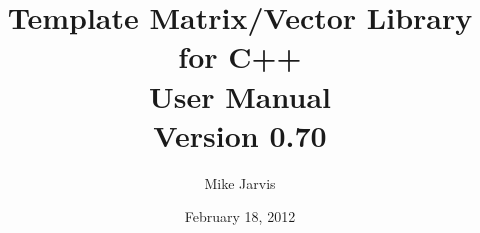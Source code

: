 \documentclass[twoside,letterpaper,11pt]{article}
\newcommand{\tmvversion}{0.70}
\begin{document}
\title{Template Matrix/Vector Library for C++ \\ User Manual \\ Version \tmvversion}
\author{Mike Jarvis}
\date{February 18, 2012}
\maketitle

\tableofcontents

\newpage


\newpage


\newpage


\newpage


\newpage


\newpage


\newpage


\newpage


\newpage


\newpage


\newpage


\newpage


\newpage


\newpage


\newpage


\newpage


\newpage


\newpage


\newpage


\newpage
\printindex
\end{document}
